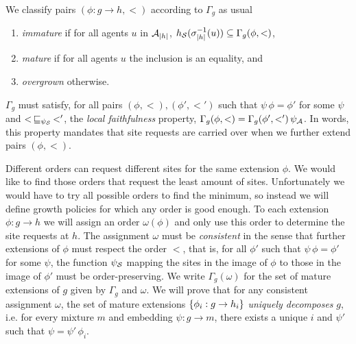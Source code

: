 \documentclass[a4paper,12pt]{article}
\newcommand{\ie}{i.e.\xspace}
\newcommand{\anon}[1]{\left|#1\right|}
\newcommand{\gp}{\Gamma}
\begin{document}

We classify pairs $(\phi: g \to h, <)$ according to $\gp_g$ as usual
\begin{enumerate}[label={(\roman*)}]
\item \emph{immature} if for all agents $u$ in $\agents_{\anon{h}}$,
  $h_\sites(\sitemap^{-1}_{\anon{h}}(u)) \subseteq \gp_g(\phi, <)$,
\item \emph{mature} if for all agents $u$
  the inclusion is an equality, and
\item \emph{overgrown} otherwise.
\end{enumerate}
$\gp_g$ must satisfy,
for all pairs $(\phi, <), (\phi', <')$ such that
$\psi \, \phi = \phi'$ for some $\psi$ and
$< \,\sqsubseteq_{\psi_{\mathcal{S}}}\, <'$,
the \emph{local faithfulness} property,
$\gp_g(\phi, <) = \gp_g(\phi', {<'}) \, \psi_\agents$.
In words, this property mandates that site requests
are carried over when we further extend pairs $(\phi, <)$.

Different orders can request different sites
for the same extension $\phi$.
We would like to find those orders
that request the least amount of sites.
Unfortunately we would have to
try all possible orders to find the minimum,
so instead we will define growth policies
for which any order is good enough.
To each extension $\phi: g \to h$
we will assign an order $\omega(\phi)$
and only use this order to determine the site requests at $h$.
The assignment $\omega$ must be \emph{consistent}
in the sense that further extensions of $\phi$
must respect the order $<$,
that is, for all $\phi'$ such that $\psi\,\phi = \phi'$
for some $\psi$, the function $\psi_{\mathcal{S}}$ mapping the sites
in the image of $\phi$ to those in the image of $\phi'$
must be order-preserving.
We write $\gp_g(\omega)$ for the set of mature extensions of $g$
given by $\gp_g$ and $\omega$.
We will prove that
for any consistent assignment $\omega$, %
the set of mature extensions $\left\{ \phi_i: g \to h_i \right\}$
\emph{uniquely decomposes} $g$,
\ie for every mixture $m$ and embedding $\psi: g \to m$,
there exists a unique $i$ and $\psi'$
such that $\psi = \psi' \, \phi_i$.
\end{document}
